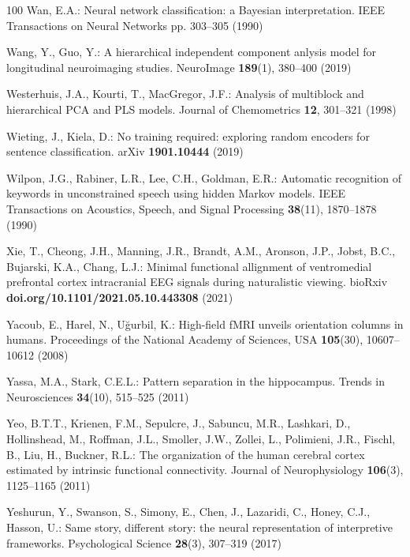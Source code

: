 \documentclass[runningheads]{llncs}
\begin{document}
\begin{thebibliography}{100}
Wan, E.A.: Neural network classification: a {Bayesian} interpretation. {IEEE}
  Transactions on Neural Networks pp. 303--305 (1990)

Wang, Y., Guo, Y.: A hierarchical independent component anlysis model for
  longitudinal neuroimaging studies. {NeuroImage}  \textbf{189}(1),  380--400
  (2019)

Westerhuis, J.A., Kourti, T., MacGregor, J.F.: Analysis of multiblock and
  hierarchical {PCA} and {PLS} models. Journal of Chemometrics  \textbf{12},
  301--321 (1998)

Wieting, J., Kiela, D.: No training required: exploring random encoders for
  sentence classification. {arXiv}  \textbf{1901.10444} (2019)

Wilpon, J.G., Rabiner, L.R., Lee, C.H., Goldman, E.R.: Automatic recognition of
  keywords in unconstrained speech using hidden {M}arkov models. {IEEE}
  Transactions on Acoustics, Speech, and Signal Processing  \textbf{38}(11),
  1870--1878 (1990)

Xie, T., Cheong, J.H., Manning, J.R., Brandt, A.M., Aronson, J.P., Jobst, B.C.,
  Bujarski, K.A., Chang, L.J.: Minimal functional allignment of ventromedial
  prefrontal cortex intracranial {EEG} signals during naturalistic viewing.
  {bioRxiv}  \textbf{doi.org/10.1101/2021.05.10.443308} (2021)

Yacoub, E., Harel, N., U{\u{g}}urbil, K.: High-field {fMRI} unveils orientation
  columns in humans. Proceedings of the National Academy of Sciences, {USA}
  \textbf{105}(30),  10607--10612 (2008)

Yassa, M.A., Stark, C.E.L.: Pattern separation in the hippocampus. Trends in
  Neurosciences  \textbf{34}(10),  515--525 (2011)

Yeo, B.T.T., Krienen, F.M., Sepulcre, J., Sabuncu, M.R., Lashkari, D.,
  Hollinshead, M., Roffman, J.L., Smoller, J.W., Zollei, L., Polimieni, J.R.,
  Fischl, B., Liu, H., Buckner, R.L.: The organization of the human cerebral
  cortex estimated by intrinsic functional connectivity. Journal of
  Neurophysiology  \textbf{106}(3),  1125--1165 (2011)

Yeshurun, Y., Swanson, S., Simony, E., Chen, J., Lazaridi, C., Honey, C.J.,
  Hasson, U.: Same story, different story: the neural representation of
  interpretive frameworks. Psychological Science  \textbf{28}(3),  307--319
  (2017)


\end{thebibliography}
\end{document}
